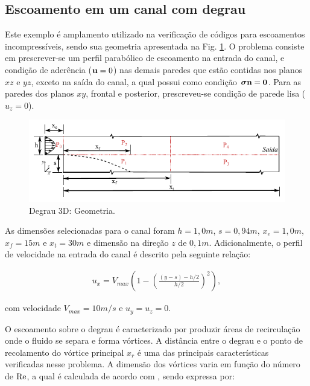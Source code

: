 \documentclass[tese_patricia]{subfiles}
\begin{document}
\subsection {Escoamento em um canal com degrau}

Este exemplo é amplamento utilizado na verificação de códigos para escoamentos incompressíveis, sendo sua geometria apresentada na Fig. \ref{fig:degrau_geo}.  O problema consiste em prescrever-se um perfil parabólico de escoamento na entrada do canal, e condição de aderência ($\mathbf{u} = 0$) nas demais paredes que estão contidas nos planos $xz$ e $yz$, exceto na saída do canal, a qual possui como condição $\boldsymbol{\sigma}\mathbf{n} = \mathbf{0}$. Para as paredes dos planos $xy$, frontal e posterior, prescreveu-se condição de parede lisa ($u_{z}=0$). 

\begin{figure}[htb!]
	\centering
	\includegraphics[scale=1.2,trim=0cm 0cm 0cm 0cm, clip=true]{Imagens/Cap3/degrau.pdf}
	\caption{Degrau 3D: Geometria.}
	\label{fig:degrau_geo}
\end{figure}


As dimensões selecionadas para o canal foram $h = 1,0m$, $s = 0,94m$, $x_{e}= 1,0m$, $x_{f}= 15m$ e $x_{t} = 30m$ e dimensão na direção $z$ de $0,1m$. Adicionalmente, o perfil de velocidade na entrada do canal é descrito pela seguinte relação:

\begin{align}
u_{x} = V_{max} \left(1-\left(\frac{\left(y-s\right)-h/2}{h/2}\right)^{2}\right),
\end{align}

\noindent com velocidade $V_{max} = 10 m/s$ e $u_{y} = u_{z} = 0$.

O escoamento sobre o degrau é caracterizado por produzir áreas de recirculação onde o fluido se separa e forma vórtices. A distância entre o degrau e o ponto de recolamento do vórtice principal $x_{r}$ é uma das principais características verificadas nesse problema. A dimensão dos vórtices varia em função do número de $\mathrm{Re}$, a qual é calculada de acordo com , sendo expressa por:
\end{document}
